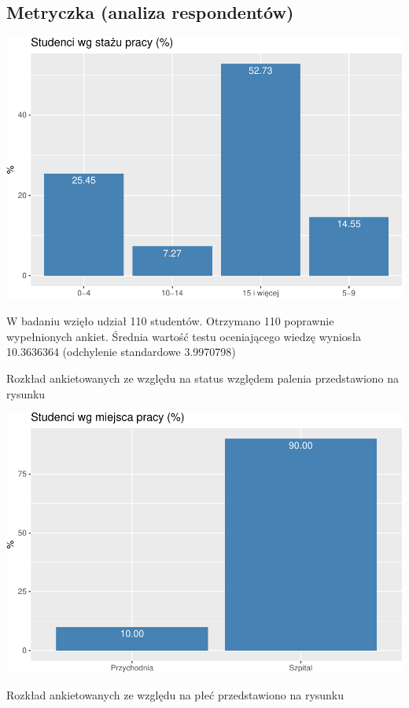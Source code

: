 \documentclass[
  openany]{book}
\begin{document}
\hypertarget{metryczka-analiza-respondentuxf3w}{%
\subsection{Metryczka (analiza respondentów)}\label{metryczka-analiza-respondentuxf3w}}

\includegraphics{_main_files/figure-latex/unnamed-chunk-82-1.pdf}

W badaniu wzięło udział 110 studentów.
Otrzymano 110 poprawnie
wypełnionych ankiet. Średnia wartość testu oceniającego wiedzę
wyniosła 10.3636364 (odchylenie
standardowe 3.9970798)

Rozkład ankietowanych ze względu na status względem
palenia przedstawiono na rysunku

\includegraphics{_main_files/figure-latex/unnamed-chunk-83-1.pdf}

Rozkład ankietowanych ze względu na płeć przedstawiono na rysunku
\end{document}
